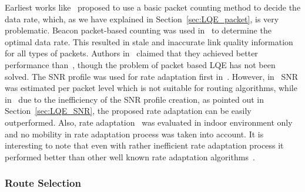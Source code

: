 \documentclass[11pt,draftclsnofoot,journal,onecolumn]{IEEEtran}
\begin{document}
Earliest works like~\cite{Holland_Mobicom_2001,Lacage_MSWIM_2004} proposed to use a basic packet counting method to decide the data rate, which, as we have explained in Section~\ref{sec:LQE_packet}, is very problematic. Beacon packet-based counting was used in~\cite{Bicket_SampleRate_2005} to determine the optimal data rate. This resulted in stale and inaccurate link quality information for all types of packets. Authors in~\cite{Wong_Mobilcom_2006} claimed that they achieved better performance than~\cite{Bicket_SampleRate_2005}, though the problem of packet based LQE has not been solved. The SNR profile was used for rate adaptation first in~\cite{Judd_Mobicom_2007,Zhang_Infocom_2008}. However, in~\cite{Judd_Mobicom_2007} SNR was estimated per packet level which is not suitable for routing algorithms, while in~\cite{Zhang_Infocom_2008} due to the inefficiency of the SNR profile creation, as pointed out in Section~\ref{sec:LQE_SNR}, the proposed rate adaptation can be easily outperformed. Also, rate adaptation~\cite{Zhang_Infocom_2008} was evaluated in indoor environment only and no mobility in rate adaptation process was taken into account. It is interesting to note that even with rather inefficient rate adaptation process it performed better than other well known rate adaptation algorithms~\cite{Holland_Mobicom_2001,Sadeghi_mobicom_2002,Chen_infocom_2007}.

\subsubsection{Route Selection}
\end{document}
